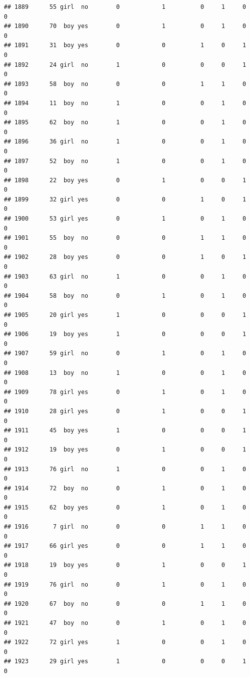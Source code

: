 \documentclass[man]{apa6}
\begin{document}
\begin{verbatim}
## 1889      55 girl  no        0            1          0     1     0     0
## 1890      70  boy yes        0            1          0     1     0     0
## 1891      31  boy yes        0            0          1     0     1     0
## 1892      24 girl  no        1            0          0     0     1     0
## 1893      58  boy  no        0            0          1     1     0     0
## 1894      11  boy  no        1            0          0     1     0     0
## 1895      62  boy  no        1            0          0     1     0     0
## 1896      36 girl  no        1            0          0     1     0     0
## 1897      52  boy  no        1            0          0     1     0     0
## 1898      22  boy yes        0            1          0     0     1     0
## 1899      32 girl yes        0            0          1     0     1     0
## 1900      53 girl yes        0            1          0     1     0     0
## 1901      55  boy  no        0            0          1     1     0     0
## 1902      28  boy yes        0            0          1     0     1     0
## 1903      63 girl  no        1            0          0     1     0     0
## 1904      58  boy  no        0            1          0     1     0     0
## 1905      20 girl yes        1            0          0     0     1     0
## 1906      19  boy yes        1            0          0     0     1     0
## 1907      59 girl  no        0            1          0     1     0     0
## 1908      13  boy  no        1            0          0     1     0     0
## 1909      78 girl yes        0            1          0     1     0     0
## 1910      28 girl yes        0            1          0     0     1     0
## 1911      45  boy yes        1            0          0     0     1     0
## 1912      19  boy yes        0            1          0     0     1     0
## 1913      76 girl  no        1            0          0     1     0     0
## 1914      72  boy  no        0            1          0     1     0     0
## 1915      62  boy yes        0            1          0     1     0     0
## 1916       7 girl  no        0            0          1     1     0     0
## 1917      66 girl yes        0            0          1     1     0     0
## 1918      19  boy yes        0            1          0     0     1     0
## 1919      76 girl  no        0            1          0     1     0     0
## 1920      67  boy  no        0            0          1     1     0     0
## 1921      47  boy  no        0            1          0     1     0     0
## 1922      72 girl yes        1            0          0     1     0     0
## 1923      29 girl yes        1            0          0     0     1     0

\end{verbatim}
\end{document}
